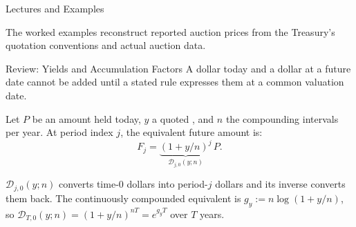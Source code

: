 \documentclass[aspectratio=169,11pt]{beamer}
\begin{document}
\begin{frame}{Lectures and Examples}
  \vspace{0.5em}
  {\normalsize\textbf{} }

  \vspace{1.0em}
  The worked examples reconstruct reported auction prices from the Treasury's
  quotation conventions and actual auction data.

  \vspace{0.8em}
  {\normalsize\textbf{} }

  \vspace{0.2em}

  \vspace{0.5em}
  {\normalsize\textbf{} }

  \vspace{0.2em}

\end{frame}


\begin{frame}{Review: Yields and Accumulation Factors}
   A dollar today and a dollar at a
  future date cannot be added until a stated rule expresses them at a common
  valuation date.

  \vspace{0.4em}
  Let $P$ be an amount held today, $y$ a quoted ,
  and $n$ the compounding intervals per year. At period index $j$, the
  equivalent future amount is:
  \[
    F_j=\underbrace{\left(1+y/n\right)^{j}}_{\mathcal D_{j,0}(y;n)}\,P .
  \]

  $\mathcal D_{j,0}(y;n)$ converts time-0 dollars into period-$j$ dollars and its
  inverse converts them back. The continuously compounded equivalent is
  $g_y:=n\log(1+y/n)$, so $\mathcal D_{T,0}(y;n)=(1+y/n)^{nT}=e^{g_yT}$ over $T$
  years.

\end{frame}
\end{document}
